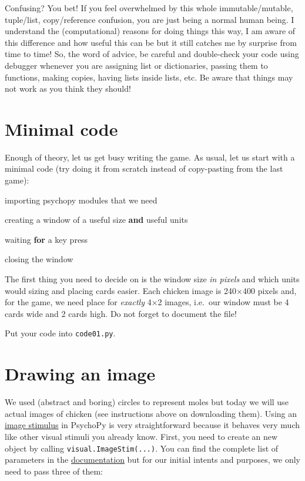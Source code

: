 \documentclass[
]{book}
\newenvironment{Shaded}{\begin{snugshade}}{\end{snugshade}}
\newcommand{\ControlFlowTok}[1]{\textcolor[rgb]{0.13,0.29,0.53}{\textbf{#1}}}
\newcommand{\KeywordTok}[1]{\textcolor[rgb]{0.13,0.29,0.53}{\textbf{#1}}}
\newcommand{\NormalTok}[1]{#1}
\begin{document}
Confusing? You bet! If you feel overwhelmed by this whole immutable/mutable, tuple/list, copy/reference confusion, you are just being a normal human being. I understand the (computational) reasons for doing things this way, I am aware of this difference and how useful this can be but it still catches me by surprise from time to time! So, the word of advice, be careful and double-check your code using debugger whenever you are assigning list or dictionaries, passing them to functions, making copies, having lists inside lists, etc. Be aware that things may not work as you think they should!

\hypertarget{minimal-code}{%
\section{Minimal code}\label{minimal-code}}

Enough of theory, let us get busy writing the game. As usual, let us start with a minimal code (try doing it from scratch instead of copy-pasting from the last game):

\begin{Shaded}
\begin{Highlighting}[]
\NormalTok{importing psychopy modules that we need}
 
\NormalTok{creating a window of a useful size }\KeywordTok{and}\NormalTok{ useful units}

\NormalTok{waiting }\ControlFlowTok{for}\NormalTok{ a key press}

\NormalTok{closing the window}
\end{Highlighting}
\end{Shaded}

The first thing you need to decide on is the window size \emph{in pixels} and which units would sizing and placing cards easier. Each chicken image is 240×400 pixels and, for the game, we need place for \emph{exactly} 4×2 images, i.e.~our window must be 4 cards wide and 2 cards high. Do not forget to document the file!

Put your code into \texttt{code01.py}.

\hypertarget{imagestim}{%
\section{Drawing an image}\label{imagestim}}

We used (abstract and boring) circles to represent moles but today we will use actual images of chicken (see instructions above on downloading them). Using an \href{https://psychopy.org/api/visual/imagestim.html}{image stimulus} in PsychoPy is very straightforward because it behaves very much like other visual stimuli you already know. First, you need to create an new object by calling \texttt{visual.ImageStim(...)}. You can find the complete list of parameters in the \href{(https://psychopy.org/api/visual/imagestim.html)}{documentation} but for our initial intents and purposes, we only need to pass three of them:
\end{document}
